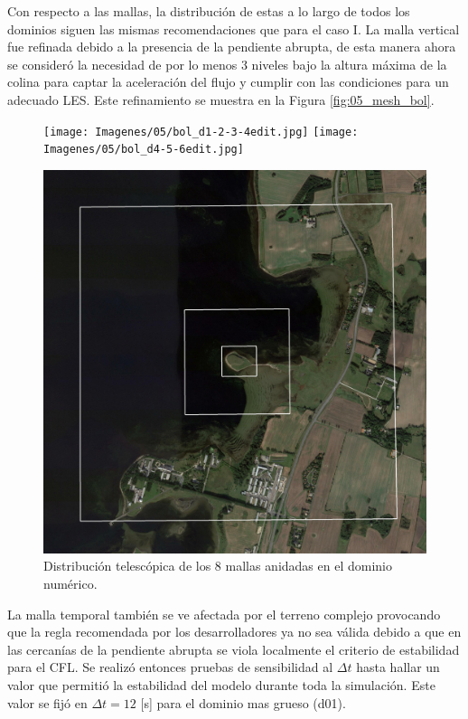 Con respecto a las mallas, la distribución de estas a lo largo de todos los dominios siguen las mismas recomendaciones que para el caso I. La malla vertical fue refinada debido a la presencia de la pendiente abrupta, de esta manera ahora se consideró la necesidad de por lo menos 3 niveles bajo la altura máxima de la colina para captar la aceleración del flujo y cumplir con las condiciones para un adecuado LES. Este refinamiento se muestra en la Figura \ref{fig:05_mesh_bol}.

\begin{figure}[H]
	\centering
	\texttt{[image: Imagenes/05/bol\_d1-2-3-4edit.jpg]}
	\texttt{[image: Imagenes/05/bol\_d4-5-6edit.jpg]}
	
	\bigskip
	\includegraphics[width=0.48\linewidth,page=1,trim={5mm 3mm 3mm 3mm},clip,frame]{Imagenes/05/bol_d6-7-8edit.jpg}%
	
	\caption{Distribución telescópica de los 8 mallas anidadas en el dominio numérico.}
	\label{fig:05_dom_bol}
\end{figure}

La malla temporal también se ve afectada por el terreno complejo provocando que la regla recomendada por los desarrolladores ya no sea válida debido a que en las cercanías de la pendiente abrupta se viola localmente el criterio de estabilidad para el CFL. Se realizó entonces pruebas de sensibilidad al $\Delta t$ hasta hallar un valor que permitió la estabilidad del modelo durante toda la simulación. Este valor se fijó en $\Delta t = 12$ [s] para el dominio mas grueso (d01).

